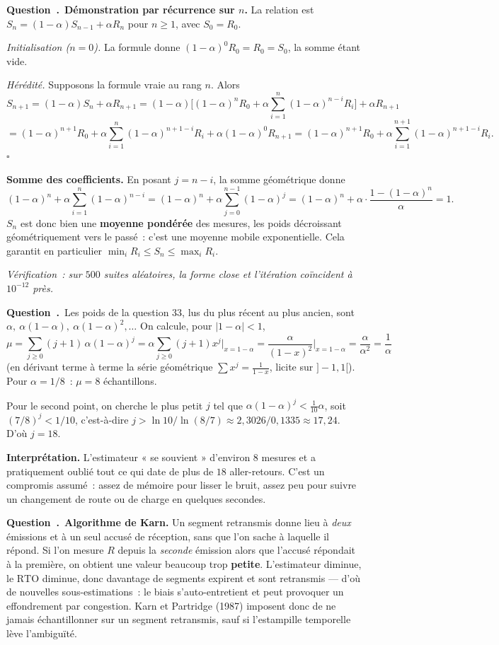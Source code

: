 \documentclass[11pt,a4paper]{article}
\renewcommand{\Q}{\medskip\par\stepcounter{qcnt}\noindent\textbf{\color{cnc}Question~\theqcnt.}~}
\begin{document}
\Q \textbf{Démonstration par récurrence sur $n$.} La relation est
$S_n=(1-\alpha)S_{n-1}+\alpha R_n$ pour $n\ge 1$, avec $S_0=R_0$.

\emph{Initialisation ($n=0$).} La formule donne $(1-\alpha)^0R_0=R_0=S_0$, la somme étant
vide.

\emph{Hérédité.} Supposons la formule vraie au rang $n$. Alors
\[
S_{n+1}=(1-\alpha)S_n+\alpha R_{n+1}
=(1-\alpha)\Big[(1-\alpha)^nR_0+\alpha\sum_{i=1}^{n}(1-\alpha)^{n-i}R_i\Big]+\alpha R_{n+1}
\]
\[
=(1-\alpha)^{n+1}R_0+\alpha\sum_{i=1}^{n}(1-\alpha)^{n+1-i}R_i+\alpha(1-\alpha)^{0}R_{n+1}
=(1-\alpha)^{n+1}R_0+\alpha\sum_{i=1}^{n+1}(1-\alpha)^{n+1-i}R_i .
\]
\hfill$\square$

\textbf{Somme des coefficients.} En posant $j=n-i$, la somme géométrique donne
\[ (1-\alpha)^n+\alpha\sum_{i=1}^{n}(1-\alpha)^{n-i}
 = (1-\alpha)^n+\alpha\sum_{j=0}^{n-1}(1-\alpha)^{j}
 = (1-\alpha)^n+\alpha\cdot\frac{1-(1-\alpha)^n}{\alpha}
 = 1 . \]
$S_n$ est donc bien une \textbf{moyenne pondérée} des mesures, les poids décroissant
géométriquement vers le passé~: c'est une moyenne mobile exponentielle. Cela garantit en
particulier $\min_i R_i\le S_n\le\max_i R_i$.

\emph{Vérification~: sur $500$ suites aléatoires, la forme close et l'itération coïncident à
$10^{-12}$ près.}

\Q Les poids de la question 33, lus du plus récent au plus ancien, sont
$\alpha,\ \alpha(1-\alpha),\ \alpha(1-\alpha)^2,\dots$ On calcule, pour $|1-\alpha|<1$,
\[ \mu=\sum_{j\ge 0}(j+1)\,\alpha(1-\alpha)^{j}
     =\alpha\sum_{j\ge 0}(j+1)x^{j}\Big|_{x=1-\alpha}
     =\frac{\alpha}{(1-x)^2}\Big|_{x=1-\alpha}
     =\frac{\alpha}{\alpha^2}=\boxed{\frac{1}{\alpha}} \]
(en dérivant terme à terme la série géométrique $\sum x^{j}=\frac{1}{1-x}$, licite sur
$]-1,1[$). Pour $\alpha=1/8$~: $\mu=\boxed{8}$ échantillons.

Pour le second point, on cherche le plus petit $j$ tel que
$\alpha(1-\alpha)^{j}<\tfrac{1}{10}\alpha$, soit $(7/8)^{j}<1/10$, c'est-à-dire
$j>\ln 10/\ln(8/7)\approx 2{,}3026/0{,}1335\approx 17{,}24$. D'où $\boxed{j=18}$.

\textbf{Interprétation.} L'estimateur « se souvient » d'environ $8$ mesures et a
pratiquement oublié tout ce qui date de plus de $18$ aller-retours. C'est un compromis
assumé~: assez de mémoire pour lisser le bruit, assez peu pour suivre un changement de route
ou de charge en quelques secondes.

\Q \textbf{Algorithme de Karn.} Un segment retransmis donne lieu à \emph{deux} émissions et
à un seul accusé de réception, sans que l'on sache à laquelle il répond. Si l'on mesure $R$
depuis la \emph{seconde} émission alors que l'accusé répondait à la première, on obtient une
valeur beaucoup trop \textbf{petite}. L'estimateur diminue, le $\mathrm{RTO}$ diminue, donc
davantage de segments expirent et sont retransmis — d'où de nouvelles sous-estimations~: le
biais s'auto-entretient et peut provoquer un effondrement par congestion. Karn et Partridge
(1987) imposent donc de ne jamais échantillonner sur un segment retransmis, sauf si
l'estampille temporelle lève l'ambiguïté.
\end{document}
